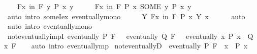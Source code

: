 \begin{isabellebody}
%
\isadelimproof
%
\endisadelimproof
%
\isatagproof
{}\isamarkupfalse%
\isanewline
\ \ \isamarkupfalse%
\ {\isachardoublequoteopen}{\isasymforall}\isactrlsub Fx\ in\ F{\isachardot}{\kern0pt}\ {\isasymexists}y{\isachardot}{\kern0pt}\ P\ x\ y{\isachardoublequoteclose}\isanewline
\ \ \isamarkupfalse%
\ \isamarkupfalse%
\ {\isachardoublequoteopen}{\isasymforall}\isactrlsub Fx\ in\ F{\isachardot}{\kern0pt}\ P\ x\ {\isacharparenleft}{\kern0pt}SOME\ y{\isachardot}{\kern0pt}\ P\ x\ y{\isacharparenright}{\kern0pt}{\isachardoublequoteclose}\isanewline
\ \ \ \ \isamarkupfalse%
\ {\isacharparenleft}{\kern0pt}auto\ intro{\isacharcolon}{\kern0pt}\ someI{\isacharunderscore}{\kern0pt}ex\ eventually{\isacharunderscore}{\kern0pt}mono{\isacharparenright}{\kern0pt}\isanewline
\ \ \isamarkupfalse%
\ \isamarkupfalse%
\ {\isachardoublequoteopen}{\isasymexists}Y{\isachardot}{\kern0pt}\ {\isasymforall}\isactrlsub Fx\ in\ F{\isachardot}{\kern0pt}\ P\ x\ {\isacharparenleft}{\kern0pt}Y\ x{\isacharparenright}{\kern0pt}{\isachardoublequoteclose}\isanewline
\ \ \ \ \isamarkupfalse%
\ auto\isanewline
{}\isamarkupfalse%
\ {\isacharparenleft}{\kern0pt}auto\ intro{\isacharcolon}{\kern0pt}\ eventually{\isacharunderscore}{\kern0pt}mono{\isacharparenright}{\kern0pt}%
\endisatagproof
{\isafoldproof}%
%
\isadelimproof
\isanewline
%
\endisadelimproof
\isanewline
{}\isamarkupfalse%
\ not{\isacharunderscore}{\kern0pt}eventually{\isacharunderscore}{\kern0pt}impI{\isacharcolon}{\kern0pt}\ {\isachardoublequoteopen}eventually\ P\ F\ {\isasymLongrightarrow}\ {\isasymnot}\ eventually\ Q\ F\ {\isasymLongrightarrow}\ {\isasymnot}\ eventually\ {\isacharparenleft}{\kern0pt}{\isasymlambda}x{\isachardot}{\kern0pt}\ P\ x\ {\isasymlongrightarrow}\ Q\ x{\isacharparenright}{\kern0pt}\ F{\isachardoublequoteclose}\isanewline
%
\isadelimproof
\ \ %
\endisadelimproof
%
\isatagproof
{}\isamarkupfalse%
\ {\isacharparenleft}{\kern0pt}auto\ intro{\isacharcolon}{\kern0pt}\ eventually{\isacharunderscore}{\kern0pt}mp{\isacharparenright}{\kern0pt}%
\endisatagproof
{\isafoldproof}%
%
\isadelimproof
\isanewline
%
\endisadelimproof
\isanewline
{}\isamarkupfalse%
\ not{\isacharunderscore}{\kern0pt}eventuallyD{\isacharcolon}{\kern0pt}\ {\isachardoublequoteopen}{\isasymnot}\ eventually\ P\ F\ {\isasymLongrightarrow}\ {\isasymexists}x{\isachardot}{\kern0pt}\ {\isasymnot}\ P\ x{\isachardoublequoteclose}\isanewline
%
\isadelimproof
\ \ %
\endisadelimproof

\end{isabellebody}
